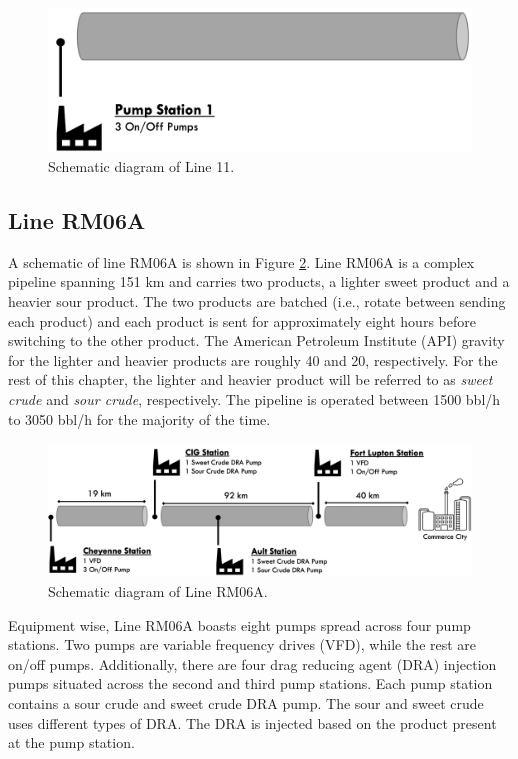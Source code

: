 \begin{figure}[h]
    \centering
    \includegraphics[scale=0.45]{images/08Line11.png}
    \caption{Schematic diagram of Line 11.}
    \label{fig:08Line11}
\end{figure}


\subsection{Line RM06A}
A schematic of line RM06A is shown in Figure \ref{fig:08RM06A}.  Line RM06A is a complex pipeline spanning 151 km and carries two products, a lighter sweet product and a heavier sour product. The two products are batched (i.e., rotate between sending each product) and each product is sent for approximately eight hours before switching to the other product. The American Petroleum Institute (API) gravity for the lighter and heavier products are roughly 40 and 20, respectively. For the rest of this chapter, the lighter and heavier product will be referred to as \textit{sweet crude} and \textit{sour crude}, respectively. The pipeline is operated between 1500 bbl/h to 3050 bbl/h for the majority of the time. 

\begin{figure}[h]
    \centering
    \includegraphics[scale=0.35]{images/08RM06A.png}
    \caption{Schematic diagram of Line RM06A.}
    \label{fig:08RM06A}
\end{figure}

Equipment wise, Line RM06A boasts eight pumps spread across four pump stations. Two pumps are variable frequency drives (VFD), while the rest are on/off pumps. Additionally, there are four drag reducing agent (DRA) injection pumps situated across the second and third pump stations. Each pump station contains a sour crude and sweet crude DRA pump. The sour and sweet crude uses different types of DRA.  The DRA is injected based on the product present at the pump station. 



